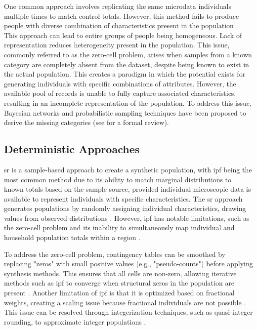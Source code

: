﻿\documentclass[../main.tex]{subfiles}
\begin{document}
One common approach involves replicating the same microdata individuals multiple times to match control totals. However, this method fails to produce people with diverse combination of characteristics present in the population \citep{Garrido2019PredictionModelling}. This approach can lead to entire groups of people being homogeneous. Lack of representation reduces heterogeneity present in the population. This issue, commonly referred to as the zero-cell problem, arises when samples from a known category are completely absent from the dataset, despite being known to exist in the actual population\citep{Sane2024ASynthesis}. This creates a paradigm in which the potential exists for generating individuals with specific combinations of attributes. However, the available pool of records is unable to fully capture associated characteristics, resulting in an incomplete representation of the population. To address this issue, Bayesian networks and probabilistic sampling techniques have been proposed to derive the missing categories (see  for a formal review).

\subsection{Deterministic Approaches}
\gls{sr} is a sample-based approach to create a synthetic population, with \gls{ipf} being the most common method due to its ability to match marginal distributions to known totals based on the sample source, provided individual microscopic data is available to represent individuals with specific characteristics. The \gls{sr} approach generates populations by randomly assigning individual characteristics, drawing values from observed distributions \citep{Barthelemy2012SyntheticSample, Gargiulo2010AnHouseholds}. However, \gls{ipf} has notable limitations, such as the zero-cell problem and its inability to simultaneously map individual and household population totals within a region \citep{Lovelace2014ALevels}.

To address the zero-cell problem, contingency tables can be smoothed by replacing "zeros" with small positive values (e.g., "pseudo-counts") before applying synthesis methods. This ensures that all cells are non-zero, allowing iterative methods such as \gls{ipf} to converge when structural zeros in the population are present \citep{Smith2017PopulationSampling,Lovelace2013TruncateMicrosimulation}. Another limitation of \gls{ipf} is that it is optimized based on fractional weights, creating a scaling issue because fractional individuals are not possible \citep{Namazi-Rad2017AnSurveydata}. This issue can be resolved through integerization techniques, such as quasi-integer rounding, to approximate integer populations \citep{Smith2017PopulationSampling}.
\end{document}
